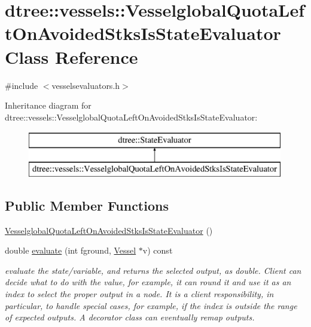 \hypertarget{classdtree_1_1vessels_1_1_vesselglobal_quota_left_on_avoided_stks_is_state_evaluator}{}\section{dtree\+::vessels\+::Vesselglobal\+Quota\+Left\+On\+Avoided\+Stks\+Is\+State\+Evaluator Class Reference}
\label{classdtree_1_1vessels_1_1_vesselglobal_quota_left_on_avoided_stks_is_state_evaluator}


{\ttfamily \#include $<$vesselsevaluators.\+h$>$}

Inheritance diagram for dtree\+::vessels\+::Vesselglobal\+Quota\+Left\+On\+Avoided\+Stks\+Is\+State\+Evaluator\+:\begin{figure}[H]
\begin{center}
\leavevmode
\includegraphics[height=2.000000cm]{d6/da7/classdtree_1_1vessels_1_1_vesselglobal_quota_left_on_avoided_stks_is_state_evaluator}
\end{center}
\end{figure}
\subsection*{Public Member Functions}
\begin{DoxyCompactItemize}
\item 
\mbox{\hyperlink{classdtree_1_1vessels_1_1_vesselglobal_quota_left_on_avoided_stks_is_state_evaluator_af1d6787487aad2c399eff59801c0ae81}{Vesselglobal\+Quota\+Left\+On\+Avoided\+Stks\+Is\+State\+Evaluator}} ()
\item 
double \mbox{\hyperlink{classdtree_1_1vessels_1_1_vesselglobal_quota_left_on_avoided_stks_is_state_evaluator_a272ce0067644fd5a3ad52c37f9f40ae2}{evaluate}} (int fground, \mbox{\hyperlink{class_vessel}{Vessel}} $\ast$v) const
\begin{DoxyCompactList}\small\item\em evaluate the state/variable, and returns the selected output, as double. Client can decide what to do with the value, for example, it can round it and use it as an index to select the proper output in a node. It is a client responsibility, in particular, to handle special cases, for example, if the index is outside the range of expected outputs. A decorator class can eventually remap outputs. \end{DoxyCompactList}\end{DoxyCompactItemize}


